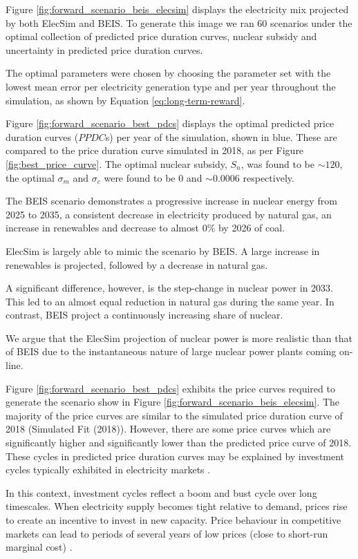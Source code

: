 Figure \ref{fig:forward_scenario_beis_elecsim} displays the electricity mix projected by both ElecSim and BEIS. To generate this image we ran 60 scenarios under the optimal collection of predicted price duration curves, nuclear subsidy and uncertainty in predicted price duration curves. 

The optimal parameters were chosen by choosing the parameter set with the lowest mean error per electricity generation type and per year throughout the simulation, as shown by Equation \ref{eq:long-term-reward}.


Figure \ref{fig:forward_scenario_best_pdcs} displays the optimal predicted price duration curves ($PPDC$s) per year of the simulation, shown in blue. These are compared to the price duration curve simulated in 2018, as per Figure \ref{fig:best_price_curve}. The optimal nuclear subsidy, $S_n$, was found to be ${\sim}$\textsterling $120$, the optimal $\sigma_m$ and $\sigma_c$ were found to be $0$ and ${\sim}0.0006$ respectively.

The BEIS scenario demonstrates a progressive increase in nuclear energy from 2025 to 2035, a consistent decrease in electricity produced by natural gas, an increase in renewables and decrease to almost 0\% by 2026 of coal.

ElecSim is largely able to mimic the scenario by BEIS. A large increase in renewables is projected, followed by a decrease in natural gas. 

A significant difference, however, is the step-change in nuclear power in 2033. This led to an almost equal reduction in natural gas during the same year. In contrast, BEIS project a continuously increasing share of nuclear. 

We argue that the ElecSim projection of nuclear power is more realistic than that of BEIS due to the instantaneous nature of large nuclear power plants coming on-line.

Figure \ref{fig:forward_scenario_best_pdcs} exhibits the price curves required to generate the scenario show in Figure \ref{fig:forward_scenario_beis_elecsim}. The majority of the price curves are similar to the simulated price duration curve of 2018 (Simulated Fit (2018)). However, there are some price curves which are significantly higher and significantly lower than the predicted price curve of 2018. These cycles in predicted price duration curves may be explained by investment cycles typically exhibited in electricity markets \cite{Gross2007}. 

In this context, investment cycles reflect a boom and bust cycle over long timescales. When electricity supply becomes tight relative to demand, prices rise to create an incentive to invest in new capacity. Price behaviour in competitive markets can lead to periods of several years of low prices (close to short-run marginal cost) \cite{white2005concentrated}. 

